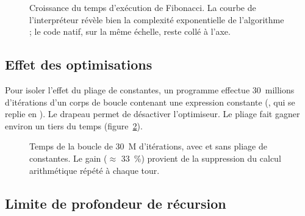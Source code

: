 \begin{figure}[ht]
\centering
{}
\caption{Croissance du temps d'exécution de Fibonacci. La courbe de
l'interpréteur révèle bien la complexité exponentielle de l'algorithme ; le code
natif, sur la même échelle, reste collé à l'axe.}
\label{fig:bench-fib}
\end{figure}

\subsection{Effet des optimisations}

Pour isoler l'effet du pliage de constantes, un programme effectue 30~millions
d'itérations d'un corps de boucle contenant une expression constante
(, qui se replie en ). Le drapeau
 permet de désactiver l'optimiseur. Le pliage fait gagner environ
un tiers du temps (figure~\ref{fig:bench-opt}).

\begin{figure}[ht]
\centering
{}
\caption{Temps de la boucle de 30~M d'itérations, avec et sans pliage de
constantes. Le gain ($\approx$ 33~\%) provient de la suppression du calcul
arithmétique répété à chaque tour.}
\label{fig:bench-opt}
\end{figure}

\subsection{Limite de profondeur de récursion}

